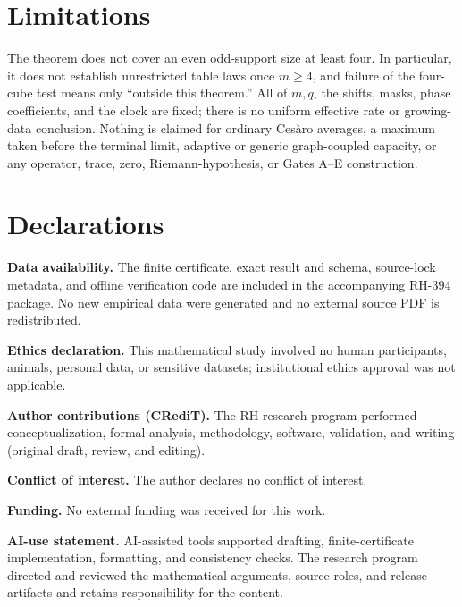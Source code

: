 \documentclass[11pt]{article}
\theoremstyle{definition}
\theoremstyle{remark}
\begin{document}
\section{Limitations}

The theorem does not cover an even odd-support size at least four.  In
particular, it does not establish unrestricted table laws once \(m\geq4\),
and failure of the four-cube test means only ``outside this theorem.''  All
of \(m,q\), the shifts, masks, phase coefficients, and the clock are fixed;
there is no uniform effective rate or growing-data conclusion.  Nothing is
claimed for ordinary Ces\`aro averages, a maximum taken before the terminal
limit, adaptive or generic graph-coupled capacity, or any operator, trace,
zero, Riemann-hypothesis, or Gates A--E construction.

\section*{Declarations}

\noindent\textbf{Data availability.}
The finite certificate, exact result and schema, source-lock metadata, and
offline verification code are included in the accompanying RH-394 package.
No new empirical data were generated and no external source PDF is
redistributed.

\noindent\textbf{Ethics declaration.}
This mathematical study involved no human participants, animals, personal
data, or sensitive datasets; institutional ethics approval was not
applicable.

\noindent\textbf{Author contributions (CRediT).}
The RH research program performed conceptualization, formal analysis,
methodology, software, validation, and writing (original draft, review, and
editing).

\noindent\textbf{Conflict of interest.}
The author declares no conflict of interest.

\noindent\textbf{Funding.}
No external funding was received for this work.

\noindent\textbf{AI-use statement.}
AI-assisted tools supported drafting, finite-certificate implementation,
formatting, and consistency checks.  The research program directed and
reviewed the mathematical arguments, source roles, and release artifacts
and retains responsibility for the content.

\sloppy\raggedright


\end{document}
